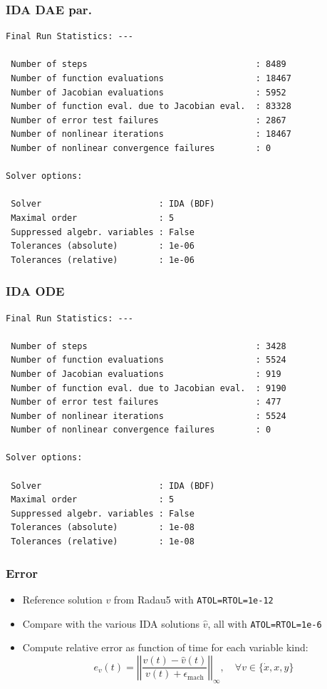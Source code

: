 \documentclass[]{beamer}
\begin{document}
\begin{frame}[fragile]
\frametitle{IDA DAE par.}
{\small
\begin{verbatim}
Final Run Statistics: --- 

 Number of steps                                 : 8489
 Number of function evaluations                  : 18467
 Number of Jacobian evaluations                  : 5952
 Number of function eval. due to Jacobian eval.  : 83328
 Number of error test failures                   : 2867
 Number of nonlinear iterations                  : 18467
 Number of nonlinear convergence failures        : 0

Solver options:

 Solver                       : IDA (BDF)
 Maximal order                : 5
 Suppressed algebr. variables : False
 Tolerances (absolute)        : 1e-06
 Tolerances (relative)        : 1e-06
\end{verbatim}
}
\end{frame}

\begin{frame}[fragile]
\frametitle{IDA ODE}
{\small
\begin{verbatim}
Final Run Statistics: --- 

 Number of steps                                 : 3428
 Number of function evaluations                  : 5524
 Number of Jacobian evaluations                  : 919
 Number of function eval. due to Jacobian eval.  : 9190
 Number of error test failures                   : 477
 Number of nonlinear iterations                  : 5524
 Number of nonlinear convergence failures        : 0

Solver options:

 Solver                       : IDA (BDF)
 Maximal order                : 5
 Suppressed algebr. variables : False
 Tolerances (absolute)        : 1e-08
 Tolerances (relative)        : 1e-08
\end{verbatim}
}
\end{frame}

\begin{frame}[fragile]
\frametitle{Error}
\begin{itemize}
\item
Reference solution $v$ from Radau5 with \verb|ATOL=RTOL=1e-12|
\item
Compare with the various IDA solutions $\hat v$, all with \verb|ATOL=RTOL=1e-6|
\item
Compute relative error as function of time for each variable kind:
\[e_v(t) = \left|\left|\frac{v(t) - \hat v(t)}{v(t) + \epsilon_{\text{mach}}}\right|\right|_\infty, \quad \forall v \in \{\dot x, x, y\}\]
\end{itemize}
\end{frame}
\end{document}
